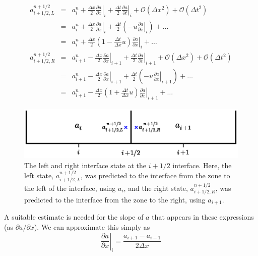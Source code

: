\begin{eqnarray}
a_{i+1/2,L}^{n+1/2} &=& a_i^n + \frac{\Delta x}{2} \left .\frac{\partial a}{\partial x} \right |_i + \frac{\Delta t}{2} \left .\frac{\partial a}{\partial t} \right |_i + \mathcal{O}(\Delta x^2) + \mathcal{O}(\Delta t^2) \nonumber \\
    &=& a_i^n + \frac{\Delta x}{2} \left .\frac{\partial a}{\partial x} \right |_i +  \frac{\Delta t}{2} \left ( - u \left .\frac{\partial a}{\partial x} \right |_i \right ) + \ldots \nonumber \\
    &=& a_i^n + \frac{\Delta x}{2} \left ( 1 - \frac{\Delta t}{\Delta x} u \right ) \left .\frac{\partial a}{\partial x} \right |_i +  \ldots \label{eq:statel}\\
a_{i+1/2,R}^{n+1/2} &=& a_{i+1}^n - \frac{\Delta x}{2} \left .\frac{\partial a}{\partial x} \right |_{i+1} + \frac{\Delta t}{2} \left .\frac{\partial a}{\partial t} \right |_{i+1} + \mathcal{O}(\Delta x^2) + \mathcal{O}(\Delta t^2) \nonumber \\
    &=& a_{i+1}^n - \frac{\Delta x}{2} \left .\frac{\partial a}{\partial x} \right |_{i+1} +  \frac{\Delta t}{2} \left ( - u \left .\frac{\partial a}{\partial x} \right |_{i+1} \right ) + \ldots \nonumber \\
    &=& a_{i+1}^n - \frac{\Delta x}{2} \left ( 1 + \frac{\Delta t}{\Delta x} u \right ) \left .\frac{\partial a}{\partial x} \right |_{i+1} +  \ldots \label{eq:stater}
\end{eqnarray}
\begin{figure}[t]
\centering
\includegraphics[width=5.0in]{riemann}
\caption[The input state to the Riemann problem]{\label{fig:riemann_adv} The left and right interface state at the
  $i+1/2$ interface.  Here, the left state, $a_{i+1/2,L}^{n+1/2}$, was
  predicted to the interface from the zone to the left of the
  interface, using $a_i$, and the right state, $a_{i+1/2,R}^{n+1/2}$,
  was predicted to the interface from the zone to the right, using
  $a_{i+1}$.}
\end{figure}

A suitable estimate is needed for the slope of $a$ that appears in these 
expressions (as $\partial a/\partial x$).  We can approximate this simply
as 
\begin{equation}
\left . \frac{\partial a}{\partial x}\right |_i = \frac{a_{i+1} - a_{i-1}}{2 \Delta x} \label{eq:slopecentered}
\end{equation}

